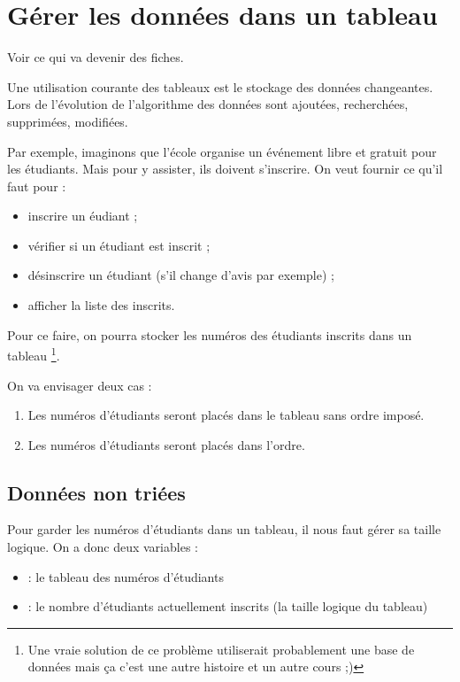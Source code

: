 \chapter{Gérer les données dans un tableau}

	\begin{TODO}
		Voir ce qui va devenir des fiches.
	\end{TODO}
	
	Une utilisation courante des tableaux
	est le stockage des données changeantes.
	Lors de l'évolution de l'algorithme
	des données sont ajoutées, recherchées, supprimées, modifiées.
	
	Par exemple, imaginons que l'école 
	organise un événement libre et gratuit pour les étudiants.
	Mais pour y assister, ils doivent s'inscrire.
	On veut fournir ce qu'il faut pour :
	\begin{itemize}
	\item inscrire un éudiant ;
	\item vérifier si un étudiant est inscrit ;
	\item désinscrire un étudiant (s'il change d'avis par exemple) ;
	\item afficher la liste des inscrits.
	\end{itemize}

	Pour ce faire,
	on pourra stocker les numéros des étudiants inscrits
	dans un tableau%
	\footnote{%
		Une vraie solution de ce problème
		utiliserait probablement une base de données
		mais ça c'est une autre histoire et un autre cours ;)
	}.
	
	On va envisager deux cas :
	\begin{enumerate}
	\item
		Les numéros d'étudiants seront placés dans le tableau sans ordre imposé.
	\item
		Les numéros d'étudiants seront placés dans l'ordre.		
	\end{enumerate}
	
	\section{Données non triées} 
		
		Pour garder les numéros d'étudiants dans un tableau,
		il nous faut gérer sa taille logique.
		On a donc deux variables :
		\begin{itemize}
		\item {} : le tableau des numéros d'étudiants
		\item {} : le nombre d'étudiants actuellement inscrits (la taille logique du tableau)
		\end{itemize}
				
